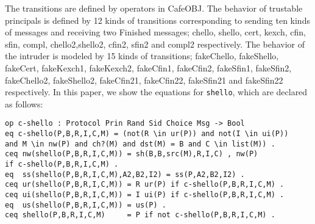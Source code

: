 \documentclass[a4paper,fleqn]{cas-dc}
\begin{document}
The transitions are defined by operators in CafeOBJ. The behavior of trustable principals is defined by 12 kinds of transitions corresponding to sending ten kinds of messages and receiving two Finished messages; chello, shello, cert,
kexch, cfin, sfin, compl, chello2,shello2, cfin2, sfin2 and compl2 respectively. The behavior of the intruder is modeled by 15 kinds of transitions; fakeChello, fakeShello, fakeCert,
fakeKexch1, fakeKexch2,
fakeCfin1, fakeCfin2, fakeSfin1,
fakeSfin2, fakeChello2,
fakeShello2, fakeCfin21, fakeCfin22, fakeSfin21 and
fakeSfin22 respectively.
In this paper, we show the equations for \verb!shello!, which are declared as follows:
\begin{small}
\begin{verbatim}
op c-shello : Protocol Prin Rand Sid Choice Msg -> Bool
eq c-shello(P,B,R,I,C,M) = (not(R \in ur(P)) and not(I \in ui(P)) 
and M \in nw(P) and ch?(M) and dst(M) = B and C \in list(M)) .
ceq nw(shello(P,B,R,I,C,M)) = sh(B,B,src(M),R,I,C) , nw(P) 
if c-shello(P,B,R,I,C,M) .
eq  ss(shello(P,B,R,I,C,M),A2,B2,I2) = ss(P,A2,B2,I2) .
ceq ur(shello(P,B,R,I,C,M)) = R ur(P) if c-shello(P,B,R,I,C,M) .
ceq ui(shello(P,B,R,I,C,M)) = I ui(P) if c-shello(P,B,R,I,C,M) .
eq  us(shello(P,B,R,I,C,M)) = us(P) .
ceq shello(P,B,R,I,C,M)     = P if not c-shello(P,B,R,I,C,M) .
\end{verbatim}
\end{small}	
\end{document}
